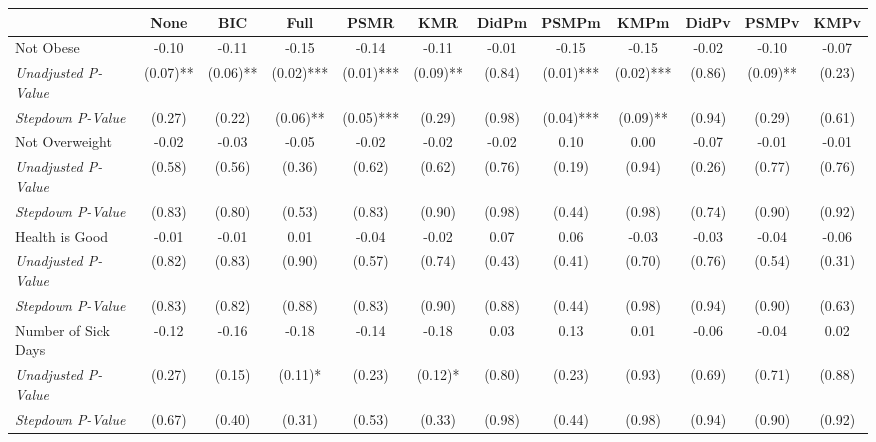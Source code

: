 \begin{tabular}{l c c c c c c c c c c c}
\toprule
 & None & BIC & Full & PSMR & KMR & DidPm & PSMPm & KMPm & DidPv & PSMPv & KMPv \\
\midrule
Not Obese & -0.10 & -0.11 & -0.15 & -0.14 & -0.11 & -0.01 & -0.15 & -0.15 & -0.02 & -0.10 & -0.07 \\
\quad \textit{Unadjusted P-Value} & (0.07)** & (0.06)** & (0.02)*** & (0.01)*** & (0.09)** & (0.84) & (0.01)*** & (0.02)*** & (0.86) & (0.09)** & (0.23) \\
\quad \textit{Stepdown P-Value} & (0.27) & (0.22) & (0.06)** & (0.05)*** & (0.29) & (0.98) & (0.04)*** & (0.09)** & (0.94) & (0.29) & (0.61) \\
Not Overweight & -0.02 & -0.03 & -0.05 & -0.02 & -0.02 & -0.02 & 0.10 & 0.00 & -0.07 & -0.01 & -0.01 \\
\quad \textit{Unadjusted P-Value} & (0.58) & (0.56) & (0.36) & (0.62) & (0.62) & (0.76) & (0.19) & (0.94) & (0.26) & (0.77) & (0.76) \\
\quad \textit{Stepdown P-Value} & (0.83) & (0.80) & (0.53) & (0.83) & (0.90) & (0.98) & (0.44) & (0.98) & (0.74) & (0.90) & (0.92) \\
Health is Good & -0.01 & -0.01 & 0.01 & -0.04 & -0.02 & 0.07 & 0.06 & -0.03 & -0.03 & -0.04 & -0.06 \\
\quad \textit{Unadjusted P-Value} & (0.82) & (0.83) & (0.90) & (0.57) & (0.74) & (0.43) & (0.41) & (0.70) & (0.76) & (0.54) & (0.31) \\
\quad \textit{Stepdown P-Value} & (0.83) & (0.82) & (0.88) & (0.83) & (0.90) & (0.88) & (0.44) & (0.98) & (0.94) & (0.90) & (0.63) \\
Number of Sick Days & -0.12 & -0.16 & -0.18 & -0.14 & -0.18 & 0.03 & 0.13 & 0.01 & -0.06 & -0.04 & 0.02 \\
\quad \textit{Unadjusted P-Value} & (0.27) & (0.15) & (0.11)* & (0.23) & (0.12)* & (0.80) & (0.23) & (0.93) & (0.69) & (0.71) & (0.88) \\
\quad \textit{Stepdown P-Value} & (0.67) & (0.40) & (0.31) & (0.53) & (0.33) & (0.98) & (0.44) & (0.98) & (0.94) & (0.90) & (0.92) \\
\bottomrule
\end{tabular}
